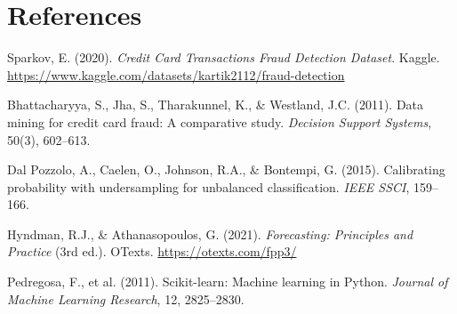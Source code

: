 \documentclass[12pt,a4paper]{report}
\begin{document}
\chapter*{References}

\begin{enumerate}[leftmargin=*, label={[\arabic*]}]
  \item Sparkov, E. (2020). \textit{Credit Card Transactions Fraud Detection Dataset}. Kaggle. \url{https://www.kaggle.com/datasets/kartik2112/fraud-detection}
  \item Bhattacharyya, S., Jha, S., Tharakunnel, K., \& Westland, J.C. (2011). Data mining for credit card fraud: A comparative study. \textit{Decision Support Systems}, 50(3), 602--613.
  \item Dal Pozzolo, A., Caelen, O., Johnson, R.A., \& Bontempi, G. (2015). Calibrating probability with undersampling for unbalanced classification. \textit{IEEE SSCI}, 159--166.
  \item Hyndman, R.J., \& Athanasopoulos, G. (2021). \textit{Forecasting: Principles and Practice} (3rd ed.). OTexts. \url{https://otexts.com/fpp3/}
  \item Pedregosa, F., et al. (2011). Scikit-learn: Machine learning in Python. \textit{Journal of Machine Learning Research}, 12, 2825--2830.
\end{enumerate}
\end{document}
